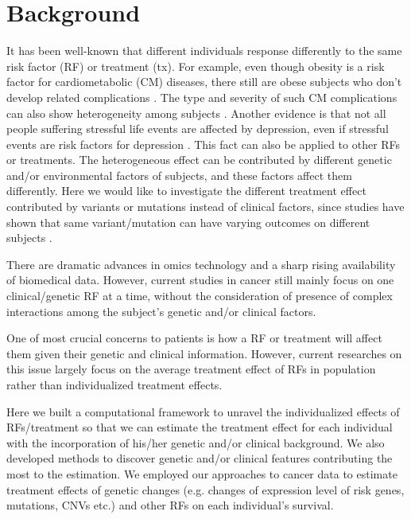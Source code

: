 \section{Background}
\label{sec:ite_bg}
  It has been well-known that different individuals response differently to the same risk factor (RF) or treatment (tx). For example, even though obesity is a risk factor for cardiometabolic (CM) diseases, there still are obese subjects who don't develop related complications \cite{neeland2018cardiovascular}. The type and severity of such CM complications can also show heterogeneity among subjects \cite{neeland2018cardiovascular}. Another evidence is that not all people suffering stressful life events are affected by depression, even if stressful events are risk factors for depression \cite{yang2015effects}. This fact can also be applied to other RFs or treatments. The heterogeneous effect can be contributed by different genetic and/or environmental factors of subjects, and these factors affect them differently. Here we would like to investigate the different treatment effect contributed by variants or mutations instead of clinical factors, since studies have shown that same variant/mutation can have varying outcomes on different subjects \cite{aggarwal2018influence, o2018cystic,vanderlaan2017mutations}.

  There are dramatic advances in omics technology and a sharp rising availability of biomedical data. However, current studies in cancer still mainly focus on one clinical/genetic RF at a time, without the consideration of presence of complex interactions among the subject's genetic and/or clinical factors. 
  
  One of most crucial concerns to patients is how a RF or treatment will affect them given their genetic and clinical information. However, current researches on this issue largely focus on the average treatment effect of RFs in population rather than individualized treatment effects.

  Here we built a computational framework to unravel the individualized effects of RFs/treatment so that we can estimate the treatment effect for each individual with the incorporation of his/her genetic and/or clinical background. We also developed methods to discover genetic and/or clinical features contributing the most to the estimation. We employed our approaches to cancer data to estimate treatment effects of genetic changes (e.g. changes of expression level of risk genes, mutations, CNVs etc.) and other RFs on each individual's survival.

